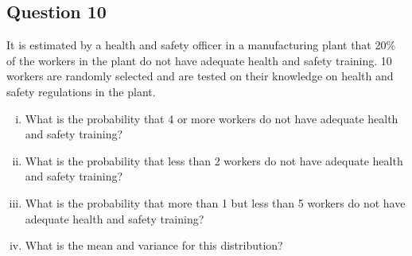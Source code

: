 \documentclass[]{report}
\begin{document}
\subsection*{Question 10}
It is estimated by a health and safety officer in a manufacturing plant that 20\% of the workers in the plant do not have adequate health and safety training. 10 workers are randomly selected and are tested on their knowledge on health and safety regulations in the plant.
\begin{enumerate}[(i)]
\item What is the probability that 4 or more workers do not have adequate health and safety training?

\item  What is the probability that less than 2 workers do not have adequate health and safety training?

\item What is the probability that more than 1 but less than 5 workers do not have adequate health and safety training?

\item What is the mean and variance for this distribution?
\end{enumerate}
\end{document}
